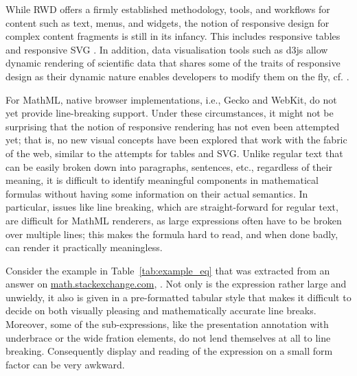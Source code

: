 \documentclass{llncs}
\begin{document}
While RWD offers a firmly established methodology, tools, and workflows for
content such as text, menus, and widgets, the notion of responsive design for
complex content fragments is still in its infancy. This includes responsive
tables \cite{zurbTable} and responsive SVG \cite{smashSvg}. In addition, data
visualisation tools such as d3js allow dynamic rendering of scientific data that
shares some of the traits of responsive design as their dynamic nature enables
developers to modify them on the fly, cf. \cite{safariD3js}.

For MathML, native browser implementations, i.e., Gecko and WebKit, do not yet
provide line-breaking support. Under these circumstances, it might not be
surprising that the notion of responsive rendering has not even been attempted
yet; that is, no new visual concepts have been explored that work with the
fabric of the web, similar to the attempts for tables and SVG. Unlike regular
text that can be easily broken down into paragraphs, sentences, etc., regardless
of their meaning, it is difficult to identify meaningful components in
mathematical formulas without having some information on their actual
semantics. In particular, issues like line breaking, which are straight-forward
for regular text, are difficult for MathML renderers, as large expressions often
have to be broken over multiple lines; this makes the formula hard to read, and
when done badly, can render it practically meaningless.

Consider the example in Table~\ref{tab:example_eq} that was extracted from an
answer on
\href{http://math.stackexchange.com/a/1285149}{math.stackexchange.com},
\cite{mathSE}. Not only is the expression rather large and unwieldy, it also is
given in a pre-formatted tabular style that makes it difficult to decide on both
visually pleasing and mathematically accurate line breaks.  Moreover, some of
the sub-expressions, like the presentation annotation with underbrace or the
wide fration elements, do not lend themselves at all to line
breaking. Consequently display and reading of the expression on a small form
factor can be very awkward.
\end{document}
